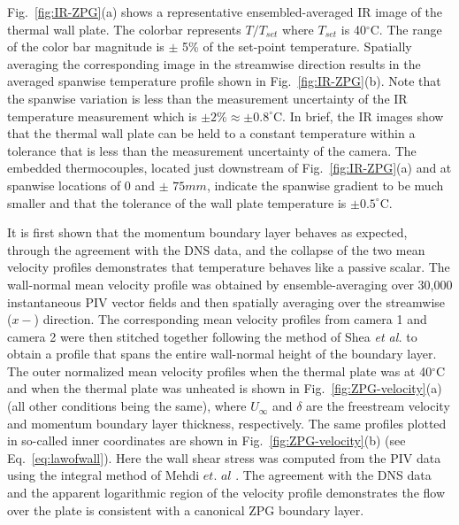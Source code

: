 Fig.~\ref{fig:IR-ZPG}(a) shows a representative ensembled-averaged IR image of the thermal wall plate. The colorbar represents $T/T_{set}$ where $T_{set}$ is 40$^\circ$C. The range of the color bar magnitude is $\pm$ 5\% of the set-point temperature. Spatially averaging the corresponding image in the streamwise direction results in the averaged spanwise temperature profile shown in Fig.~\ref{fig:IR-ZPG}(b). Note that the spanwise variation is less than the measurement uncertainty of the IR temperature measurement which is $\pm 2\% \approx \pm 0.8 ^\circ$C.  In brief, the IR images show that the thermal wall plate can be held to a constant temperature within a tolerance that is less than the measurement uncertainty of the camera. The embedded thermocouples, located just downstream of Fig.~\ref{fig:IR-ZPG}(a) and at spanwise locations of 0 and $\pm$ $75mm$, indicate the spanwise gradient to be much smaller and that the tolerance of the wall plate temperature is $\pm 0.5^\circ$C.


It is first shown that the momentum boundary layer behaves as expected, through the agreement with the DNS data, and the collapse of the two mean velocity profiles demonstrates that temperature behaves like a passive scalar. The wall-normal mean velocity profile was obtained by ensemble-averaging over 30,000 instantaneous PIV vector fields and then spatially averaging over the streamwise ($x-$) direction. The corresponding mean velocity profiles from camera 1 and camera 2 were then stitched together following the method of Shea \textit{et al.} \cite{Shea2014} to obtain a profile that spans the entire wall-normal height of the boundary layer. The outer normalized mean velocity profiles when the thermal plate was at 40$^\circ$C and when the thermal plate was unheated is shown in Fig.~\ref{fig:ZPG-velocity}(a) (all other conditions being the same), where $U_\infty$ and $\delta$ are the freestream velocity and momentum boundary layer thickness, respectively. The same profiles plotted in so-called inner coordinates are shown  in Fig.~\ref{fig:ZPG-velocity}(b) (see Eq.~\ref{eq:lawofwall}). Here the wall shear stress was computed from the PIV data using the integral method of Mehdi $\textit{et. al}$ \cite{Mehdi2011}.  The agreement with the DNS data and the apparent logarithmic region of the velocity profile demonstrates the flow over the plate is consistent with a canonical ZPG boundary layer.


